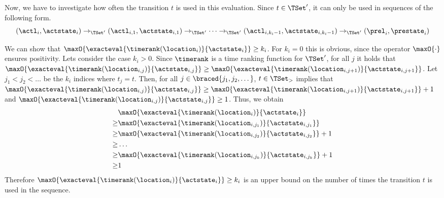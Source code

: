 Now, we have to investigate how often the transition $t$ is used in this evaluation.
Since $t \in \TSet'$, it can only be used in sequences of the following form.
\[ (\actl_i, \actstate_i) \rightarrow_{\TSet'} (\actl_{i,1}, \actstate_{i,1}) \rightarrow_{\TSet'} \dots \rightarrow_{\TSet'} (\actl_{i,k_i-1}, \actstate_{i,k_i-1}) \rightarrow_{\TSet'} (\prel_i, \prestate_i) \]

We can show that $\maxO{\exacteval{\timerank(\location_i)}{\actstate_i}} \geq k_i$.
For $k_i = 0$ this is obvious, since the operator $\maxO{\cdot}$ ensures positivity.
Lets consider the case $k_i > 0$.
Since $\timerank$ is a time ranking function for $\TSet'$, for all $j$ it holds that $\maxO{\exacteval{\timerank(\location_{i,j})}{\actstate_{i,j}}} \geq \maxO{\exacteval{\timerank(\location_{i,j+1})}{\actstate_{i,j+1}}}$.
Let $j_1 < j_2 < \dots$ be the $k_i$ indices where $t_j = t$.
Then, for all $j \in \braced{j_1, j_2, \dots}$, $t \in \TSet_>$ implies that $\maxO{\exacteval{\timerank(\location_{i,j})}{\actstate_{i,j}}} \geq \maxO{\exacteval{\timerank(\location_{i,j+1})}{\actstate_{i,j+1}}} + 1$ and $\maxO{\exacteval{\timerank(\location_{i,j})}{\actstate_{i,j}}} \geq 1$.
Thus, we obtain
\begin{align*}
  & \maxO{\exacteval{\timerank(\location_i)}{\actstate_i}} \\
  \geq & \maxO{\exacteval{\timerank(\location_{i,j_1})}{\actstate_{i,j_1}}} \\
  \geq & \maxO{\exacteval{\timerank(\location_{i,j_2})}{\actstate_{i,j_2}}} + 1 \\
  \geq & \dots \\
  \geq & \maxO{\exacteval{\timerank(\location_{i,j_k})}{\actstate_{i,j_k}}} + 1 \\
  \geq & 1
\end{align*}
Therefore $\maxO{\exacteval{\timerank(\location_i)}{\actstate_i}} \geq k_i$ is an upper bound on the number of times the transition $t$ is used in the sequence.

